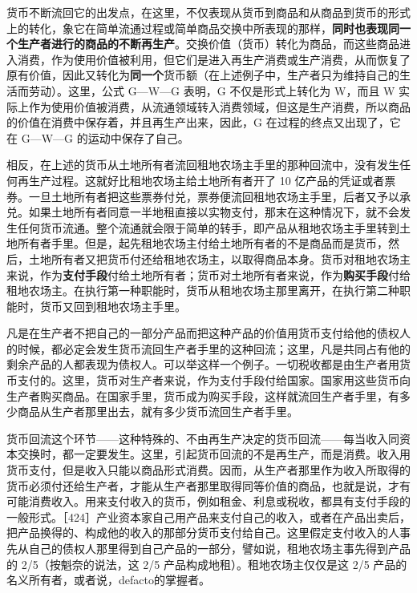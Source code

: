 货币不断流回它的出发点，在这里，不仅表现从货币到商品和从商品到货币的形式上的转化，象它在简单流通过程或简单商品交换中所表现的那样，\textbf{同时也表现同一个生产者进行的商品的不断再生产}。交换价值（货币）转化为商品，而这些商品进入消费，作为使用价值被利用，但它们是进入再生产消费或生产消费，从而恢复了原有价值，因此又转化为\textbf{同一个}货币额（在上述例子中，生产者只为维持自己的生活而劳动）。这里，公式 G—W—G 表明，G 不仅是形式上转化为 W，而且 W 实际上作为使用价值被消费，从流通领域转入消费领域，但这是生产消费，所以商品的价值在消费中保存着，并且再生产出来，因此，G 在过程的终点又出现了，它在 G—W—G 的运动中保存了自己。

相反，在上述的货币从土地所有者流回租地农场主手里的那种回流中，没有发生任何再生产过程。这就好比租地农场主给土地所有者开了 10 亿产品的凭证或者票券。一旦土地所有者把这些票券付兑，票券便流回租地农场主手里，后者又予以承兑。如果土地所有者同意一半地租直接以实物支付，那末在这种情况下，就不会发生任何货币流通。整个流通就会限于简单的转手，即产品从租地农场主手里转到土地所有者手里。但是，起先租地农场主付给土地所有者的不是商品而是货币，然后，土地所有者又把货币付还给租地农场主，以取得商品本身。货币对租地农场主来说，作为\textbf{支付手段}付给土地所有者；货币对土地所有者来说，作为\textbf{购买手段}付给租地农场主。在执行第一种职能时，货币从租地农场主那里离开，在执行第二种职能时，货币又回到租地农场主手里。

凡是在生产者不把自己的一部分产品而把这种产品的价值用货币支付给他的债权人的时候，都必定会发生货币流回生产者手里的这种回流；这里，凡是共同占有他的剩余产品的人都表现为债权人。可以举这样一个例子。一切税收都是由生产者用货币支付的。这里，货币对生产者来说，作为支付手段付给国家。国家用这些货币向生产者购买商品。在国家手里，货币成为购买手段，这样就流回生产者手里，有多少商品从生产者那里出去，就有多少货币流回生产者手里。

货币回流这个环节——这种特殊的、不由再生产决定的货币回流——每当收入同资本交换时，都一定要发生。这里，引起货币回流的不是再生产，而是消费。收入用货币支付，但是收入只能以商品形式消费。因而，从生产者那里作为收入所取得的货币必须付还给生产者，才能从生产者那里取得同等价值的商品，也就是说，才有可能消费收入。用来支付收入的货币，例如租金、利息或税收，都具有支付手段的一般形式。［424］\fontbox{~\{}产业资本家自己用产品来支付自己的收入，或者在产品出卖后，把产品换得的、构成他的收入的那部分货币支付给自己。\fontbox{\}~}这里假定支付收入的人事先从自己的债权人那里得到自己产品的一部分，譬如说，租地农场主事先得到产品的 2/5（按魁奈的说法，这 2/5 产品构成地租）。租地农场主仅仅是这 2/5 产品的名义所有者，或者说，defacto的掌握者。

